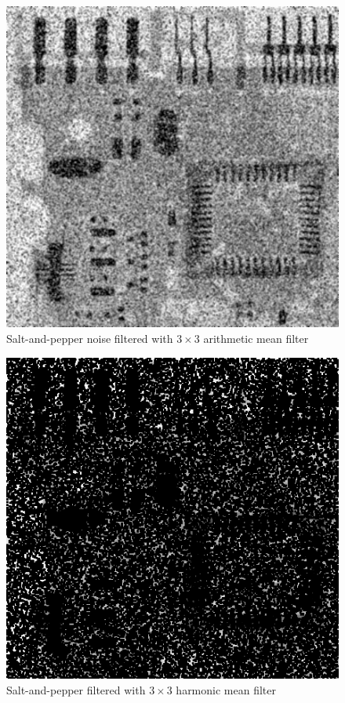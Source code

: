 \documentclass{article}
\begin{document}
\begin{figure}[H]
	\centering
	\includegraphics[width=336pt]{../result/task2/sap/sap-arithmetic.png}
	\caption{Salt-and-pepper noise filtered with $3 \times 3$ arithmetic mean filter}
	\label{fig:sapam}
\end{figure}

\begin{figure}[H]
	\centering
	\includegraphics[width=336pt]{../result/task2/sap/sap-harmonic.png}
	\caption{Salt-and-pepper filtered with $3 \times 3$ harmonic mean filter}
	\label{fig:saphm}
\end{figure}
\end{document}

